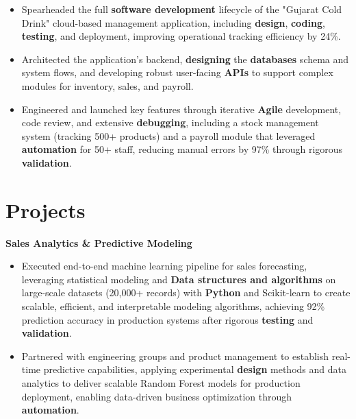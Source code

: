 \documentclass[a4paper,10pt]{article}
\begin{document}
\begin{itemize}[leftmargin=*, itemsep=0pt, parsep=1pt] %
\vspace{-7mm}
    \item Spearheaded the full \textbf{software development} lifecycle of the "Gujarat Cold Drink" cloud-based management application, including \textbf{design}, \textbf{coding}, \textbf{testing}, and deployment, improving operational tracking efficiency by 24\%.
\item Architected the application's backend, \textbf{designing} the \textbf{databases} schema and system flows, and developing robust user-facing \textbf{APIs} to support complex modules for inventory, sales, and payroll.
\item Engineered and launched key features through iterative \textbf{Agile} development, code review, and extensive \textbf{debugging}, including a stock management system (tracking 500+ products) and a payroll module that leveraged \textbf{automation} for 50+ staff, reducing manual errors by 97\% through rigorous \textbf{validation}. 

\end{itemize}

\vspace{-4mm}

\section*{Projects}
\textbf{Sales Analytics \& Predictive Modeling} \\
\begin{itemize}[leftmargin=*, itemsep=0pt, parsep=1pt]
\vspace{-7mm}
    \item Executed end-to-end machine learning pipeline for sales forecasting, leveraging statistical modeling and \textbf{Data structures and algorithms} on large-scale datasets (20,000+ records) with \textbf{Python} and Scikit-learn to create scalable, efficient, and interpretable modeling algorithms, achieving 92\% prediction accuracy in production systems after rigorous \textbf{testing} and \textbf{validation}.
    \item Partnered with engineering groups and product management to establish real-time predictive capabilities, applying experimental \textbf{design} methods and data analytics to deliver scalable Random Forest models for production deployment, enabling data-driven business optimization through \textbf{automation}.
    \end{itemize}
\end{document}
